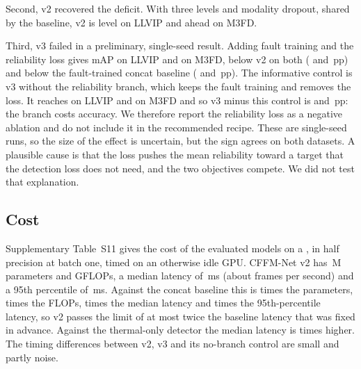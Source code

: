 Second, v2 recovered the deficit. With three levels and modality dropout, shared by the baseline, v2 is level on LLVIP and ahead on M3FD.

Third, v3 failed in a preliminary, single-seed result. Adding fault training and the reliability loss gives \resLlvipCffmVthreeSeedZeroMap{} mAP on LLVIP and \resMfdCffmVthreeSeedZeroMap{} on M3FD, below v2 on both (\marLlvipVthreeVsVtwoSeedZeroMap{} and \marMfdVthreeVsVtwoSeedZeroMap{}\,pp) and below the fault-trained concat baseline (\marLlvipVthreeVsConcatFtSeedZeroMap{} and \marMfdVthreeVsConcatFtSeedZeroMap{}\,pp). The informative control is v3 without the reliability branch, which keeps the fault training and removes the loss. It reaches \resLlvipCffmVthreeNorelSeedZeroMap{} on LLVIP and \resMfdCffmVthreeNorelSeedZeroMap{} on M3FD and so v3 minus this control is \marLlvipVthreeVsVthreeNorelSeedZeroMap{} and \marMfdVthreeVsVthreeNorelSeedZeroMap{}\,pp: the branch costs accuracy. We therefore report the reliability loss as a negative ablation and do not include it in the recommended recipe. These are single-seed runs, so the size of the effect is uncertain, but the sign agrees on both datasets. A plausible cause is that the loss pushes the mean reliability toward a target that the detection loss does not need, and the two objectives compete. We did not test that explanation.

\subsection{Cost}
\label{sec:cost}
Supplementary Table~S11 gives the cost of the evaluated models on a \latLocalDevice{}, in half precision at batch one, timed on an otherwise idle GPU. CFFM-Net v2 has \latLocalVtwoParamsM{}\,M parameters and \latLocalVtwoGflops{} GFLOPs, a median latency of \latLocalVtwoMedianMs{}\,ms (about \latLocalVtwoFps{} frames per second) and a 95th percentile of \latLocalVtwoPNinetyFiveMs{}\,ms. Against the concat baseline this is \latLocalRatioParams{} times the parameters, \latLocalRatioGflops{} times the FLOPs, \latLocalRatioMedian{} times the median latency and \latLocalRatioPNinetyFive{} times the 95th-percentile latency, so v2 passes the limit of at most twice the baseline latency that was fixed in advance. Against the thermal-only detector the median latency is \latLocalVtwoOverThmMedian{} times higher. The timing differences between v2, v3 and its no-branch control are small and partly noise.

